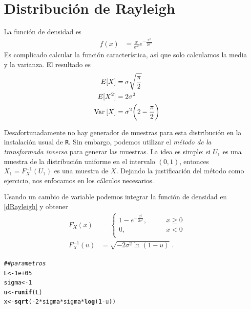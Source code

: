 \documentclass[12pt,reqno]{amsart}\usepackage[]{graphicx}\usepackage[]{color}
\makeatletter
\newcommand{\hlnum}[1]{\textcolor[rgb]{0.686,0.059,0.569}{#1}}%
\newcommand{\hlcom}[1]{\textcolor[rgb]{0.678,0.584,0.686}{\textit{#1}}}%
\newcommand{\hlopt}[1]{\textcolor[rgb]{0,0,0}{#1}}%
\newcommand{\hlstd}[1]{\textcolor[rgb]{0.345,0.345,0.345}{#1}}%
\newcommand{\hlkwb}[1]{\textcolor[rgb]{0.69,0.353,0.396}{#1}}%
\newcommand{\hlkwd}[1]{\textcolor[rgb]{0.737,0.353,0.396}{\textbf{#1}}}%
\newenvironment{kframe}{%
 \def\at@end@of@kframe{}%
 \ifinner\ifhmode%
  \def\at@end@of@kframe{\end{minipage}}%
  \begin{minipage}{\columnwidth}%
 \fi\fi%
 \def\FrameCommand##1{\hskip\@totalleftmargin \hskip-\fboxsep
 \colorbox{shadecolor}{##1}\hskip-\fboxsep
     \hskip-\linewidth \hskip-\@totalleftmargin \hskip\columnwidth}%
 \MakeFramed {\advance\hsize-\width
   \@totalleftmargin\z@ \linewidth\hsize
   \@setminipage}}%
 {\par\unskip\endMakeFramed%
 \at@end@of@kframe}
\newenvironment{knitrout}{}{} %
\makeatother
\begin{document}
\section{Distribución de Rayleigh}
La función de densidad es
\begin{equation}\label{dRayleigh}
  \begin{split}
    f(x) &= \frac{x}{\sigma^2} e^{-\frac{x^2}{2\sigma^2}}\:
  \end{split}
\end{equation}
Es complicado calcular la función característica, así que solo calculamos la media y la varianza. El resultado es
\begin{equation}\label{meanRayleigh}
  \begin{split}
    E[X] &= \sigma \sqrt{\frac{\pi}{2}} \\\
    E[X^2] &= 2 \sigma^2 \\
    \mathrm{Var}\: [X] &= \sigma^2 \biggl(2-\frac{\pi}{2}\biggr)
  \end{split}
\end{equation}

Desafortunadamente no hay generador de muestras para esta distribución en la instalación usual de \verb+R+. Sin embargo, podemos utilizar el \emph{método de la transformada inversa} para generar las muestras. La idea es simple: si $U_1$ es una muestra de la distribución uniforme en el intervalo $(0,1)$, entonces $X_1 = F_{X}^{-1}(U_1)$ es una muestra de $X$. Dejando la justificación del método como ejercicio, nos enfocamos en los cálculos necesarios.

Usando un cambio de variable podemos integrar la función de densidad en \eqref{dRayleigh} y obtener
\begin{equation}\label{cRayleigh}
  \begin{split}
  F_{X}(x) &= \begin{cases}
  1 - e^{-\frac{x^2}{2\sigma^2}} ,& \qquad x \geq 0 \\
  0 ,& \qquad x < 0 \\
  \end{cases}\\
  F_{X}^{-1}(u) &= \sqrt{-2 \sigma^2 \ln(1-u)}\:.
  \end{split}
\end{equation}

\begin{knitrout}
\color{fgcolor}\begin{kframe}
\begin{alltt}
\hlcom{## parametros}
\hlstd{L} \hlkwb{<-} \hlnum{1e+05}
\hlstd{sigma} \hlkwb{<-} \hlnum{1}
\hlstd{u} \hlkwb{<-} \hlkwd{runif}\hlstd{(L)}
\hlstd{x} \hlkwb{<-} \hlkwd{sqrt}\hlstd{(}\hlopt{-}\hlnum{2} \hlopt{*} \hlstd{sigma} \hlopt{*} \hlstd{sigma} \hlopt{*} \hlkwd{log}\hlstd{(}\hlnum{1} \hlopt{-} \hlstd{u))}
\end{alltt}
\end{kframe}
\end{knitrout}
\end{document}
